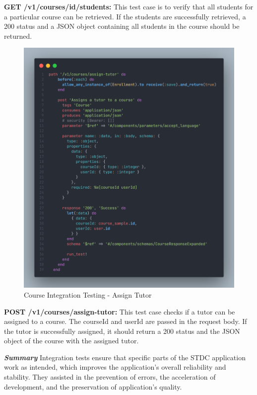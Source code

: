 \begin{justify}
\noindent \textbf{GET /v1/courses/{id}/students:} This test case is to verify that all students for a particular course can be retrieved. If the students are successfully retrieved, a 200 status and a JSON object containing all students in the course should be returned.

\begin{figure}[H]
    \centerline{\includegraphics[width=150mm,scale=1]{figures/implementation_and_testing/testing/AIT/post_v1_courses_assign_tutor.png}}
    \caption{Course Integration Testing - Assign Tutor}
    \label{Course Integration Testing - Assign Tutor}
\end{figure}

\noindent \textbf{POST /v1/courses/assign-tutor:} This test case checks if a tutor can be assigned to a course. The courseId and userId are passed in the request body. If the tutor is successfully assigned, it should return a 200 status and the JSON object of the course with the assigned tutor.


\clearpage
\vspace{0.25cm}
\newendline \textbf{\textit{Summary}}\newendline
Integration tests ensure that specific parts of the STDC application work as intended, which improves the application's overall reliability and stability. They assisted in the prevention of errors, the acceleration of development, and the preservation of application's quality.

\end{justify}
\clearpage

